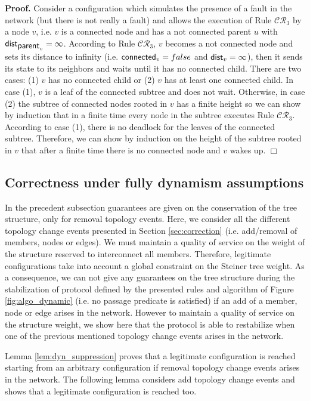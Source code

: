 \documentclass[11pt]{article}
\newenvironment{proof}{\noindent \begin{rm}{\textbf{Proof.} }}{\hspace*{\fill}$\Box$\par\end{rm} \vspace{.3cm}}
\newcommand{\parent}{\mbox{\sf parent}}
\newcommand{\dist}{\mbox{\sf dist}}
\newcommand{\connect}{\mbox{\sf connected}}
\newcommand{\CRG}{$\mathcal{CR}_3$}
\begin{document}
\begin{proof}
Consider a configuration which simulates the presence of a fault in the network (but there is not really a fault) and allows the execution of Rule \CRG\/ by a node $v$, i.e. $v$ is a connected node and has a not connected parent $u$ with $\dist_{\parent_v}=\infty$. According to Rule \CRG, $v$ becomes a not connected node and sets its distance to infinity (i.e. $\connect_v=false$ and $\dist_v=\infty$), then it sends its state to its neighbors and waits until it has no connected child. There are two cases: (1) $v$ has no connected child or (2) $v$ has at least one connected child. In case (1), $v$ is a leaf of the connected subtree and does not wait. Otherwise, in case (2) the subtree of connected nodes rooted in $v$ has a finite height so we can show by induction that in a finite time every node in the subtree executes Rule \CRG\/. According to case (1), there is no deadlock for the leaves of the connected subtree. Therefore, we can show by induction on the height of the subtree rooted in $v$ that after a finite time there is no connected node and $v$ wakes up.
\end{proof}


\subsection*{Correctness under fully dynamism  assumptions}

In the precedent subsection guarantees are given on the conservation of the tree structure, only for removal topology events. Here, we consider all the different topology change events presented in Section \ref{sec:correction} (i.e. add/removal of members, nodes or edges). We must maintain a quality of service on the weight of the structure reserved to interconnect all members. Therefore, legitimate configurations take into account a global constraint on the Steiner tree weight. As a consequence, we can not give any guarantees on the tree structure during the stabilization of protocol defined by the presented rules and algorithm of Figure \ref{fig:algo_dynamic} (i.e. no passage predicate is satisfied) if an add of a member, node or edge arises in the network. However to maintain a quality of service on the structure weight, we show here that the protocol is able to restabilize when one of the previous mentioned topology change events arises in the network.

Lemma \ref{lem:dyn_suppression} proves that a legitimate configuration is reached starting from an arbitrary configuration if removal topology change events arises in the network. The following lemma considers add topology change events and shows that a legitimate configuration is reached too.
\end{document}
